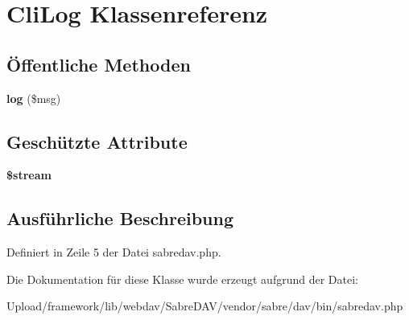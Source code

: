 \hypertarget{class_cli_log}{}\section{Cli\+Log Klassenreferenz}
\label{class_cli_log}
\subsection*{Öffentliche Methoden}
\begin{DoxyCompactItemize}
\item 
\mbox{\label{class_cli_log_a462ecd060237717c539adca570663eb0}} 
{\bfseries log} (\$msg)
\end{DoxyCompactItemize}
\subsection*{Geschützte Attribute}
\begin{DoxyCompactItemize}
\item 
\mbox{\label{class_cli_log_a3b28ff8d126a5dbc75a5f3b88102bca9}} 
{\bfseries \$stream}
\end{DoxyCompactItemize}


\subsection{Ausführliche Beschreibung}


Definiert in Zeile 5 der Datei sabredav.\+php.



Die Dokumentation für diese Klasse wurde erzeugt aufgrund der Datei\+:\begin{DoxyCompactItemize}
\item 
Upload/framework/lib/webdav/\+Sabre\+D\+A\+V/vendor/sabre/dav/bin/sabredav.\+php\end{DoxyCompactItemize}
